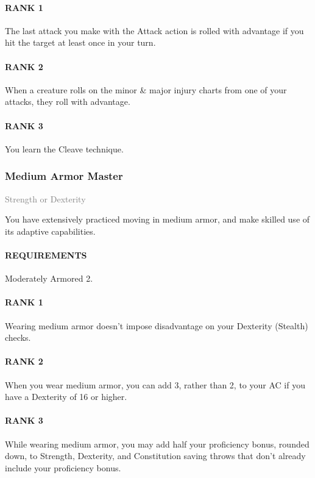 \paragraph{RANK 1} The last attack you make with the Attack action is rolled with advantage if you hit the target at least once in your turn.
\paragraph{RANK 2} When a creature rolls on the minor \& major injury charts from one of your attacks, they roll with advantage.
\paragraph{RANK 3} You learn the Cleave technique.

\subsubsection{Medium Armor Master} \label{feat::mediumarmormaster}
\small{\textcolor{gray}{Strength or Dexterity}}

\normalsize
You have extensively practiced moving in medium armor, and make skilled use of its adaptive capabilities.
\paragraph{REQUIREMENTS} Moderately Armored 2.
\paragraph{RANK 1} Wearing medium armor doesn't impose disadvantage on your Dexterity (Stealth) checks.
\paragraph{RANK 2} When you wear medium armor, you can add 3, rather than 2, to your AC if you have a Dexterity of 16 or higher.
\paragraph{RANK 3} While wearing medium armor, you may add half your proficiency bonus, rounded down, to Strength, Dexterity, and Constitution saving throws that don't already include your proficiency bonus.

